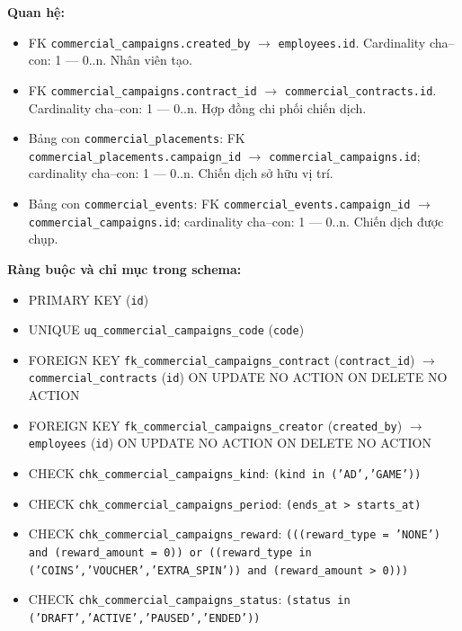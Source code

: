 \textbf{Quan hệ:}

\begin{itemize}

\item FK \texttt{commercial\_campaigns.created\_by} $\rightarrow$ \texttt{employees.id}. Cardinality cha--con: 1 — 0..n. Nhân viên tạo.

\item FK \texttt{commercial\_campaigns.contract\_id} $\rightarrow$ \texttt{commercial\_contracts.id}. Cardinality cha--con: 1 — 0..n. Hợp đồng chi phối chiến dịch.

\item Bảng con \texttt{commercial\_placements}: FK \texttt{commercial\_placements.campaign\_id} $\rightarrow$ \texttt{commercial\_campaigns.id}; cardinality cha--con: 1 — 0..n. Chiến dịch sở hữu vị trí.

\item Bảng con \texttt{commercial\_events}: FK \texttt{commercial\_events.campaign\_id} $\rightarrow$ \texttt{commercial\_campaigns.id}; cardinality cha--con: 1 — 0..n. Chiến dịch được chụp.

\end{itemize}

\textbf{Ràng buộc và chỉ mục trong schema:}

\begin{itemize}

\item PRIMARY KEY (\texttt{id})

\item UNIQUE \texttt{uq\_commercial\_campaigns\_code} (\texttt{code})

\item FOREIGN KEY \texttt{fk\_commercial\_campaigns\_contract} (\texttt{contract\_id}) $\rightarrow$ \texttt{commercial\_contracts} (\texttt{id}) ON UPDATE NO ACTION ON DELETE NO ACTION

\item FOREIGN KEY \texttt{fk\_commercial\_campaigns\_creator} (\texttt{created\_by}) $\rightarrow$ \texttt{employees} (\texttt{id}) ON UPDATE NO ACTION ON DELETE NO ACTION

\item CHECK \texttt{chk\_commercial\_campaigns\_kind}: \texttt{(kind in ('AD','GAME'))}

\item CHECK \texttt{chk\_commercial\_campaigns\_period}: \texttt{(ends\_at > starts\_at)}

\item CHECK \texttt{chk\_commercial\_campaigns\_reward}: \texttt{(((reward\_type = 'NONE') and (reward\_amount = 0)) or ((reward\_type in ('COINS','VOUCHER','EXTRA\_SPIN')) and (reward\_amount > 0)))}

\item CHECK \texttt{chk\_commercial\_campaigns\_status}: \texttt{(status in ('DRAFT','ACTIVE','PAUSED','ENDED'))}

\end{itemize}

